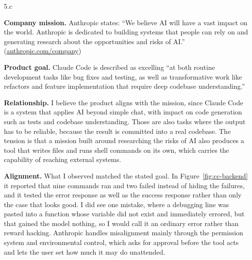 \LARGE
5.c
\normalsize

\begin{answer}
  \textbf{Company mission.} Anthropic states: ``We believe AI will have a vast impact on the world.
  Anthropic is dedicated to building systems that people can rely on and generating research about
  the opportunities and risks of AI.''
  (\href{https://www.anthropic.com/company}{anthropic.com/company})

  \medskip
  \textbf{Product goal.} Claude Code is described as excelling ``at both routine development tasks
  like bug fixes and testing, as well as transformative work like refactors and feature
  implementation that require deep codebase understanding.''

  \medskip
  \textbf{Relationship.} I believe the product aligns with the mission, since Claude Code is a
  system that applies AI beyond simple chat, with impact on code generation such as tests and
  codebase understanding. Those are also tasks where the output has to be reliable, because the
  result is committed into a real codebase. The tension is that a mission built around researching
  the risks of AI also produces a tool that writes files and runs shell commands on its own, which carries the capability of reaching external systems.

  \medskip
  \textbf{Alignment.} What I observed matched the stated goal. In Figure~\ref{fig:cc-backend} it
  reported that nine commands ran and two failed instead of hiding the failures, and it tested the
  error response as well as the success response rather than only the case that looks good. I did
  see one mistake, where a debugging line was pasted into a function whose variable did not exist
  and immediately errored, but that gained the model nothing, so I would call it an ordinary error
  rather than reward hacking. Anthropic handles misalignment mainly through the permission system and environmental control,
  which asks for approval before the tool acts and lets the user set how much it may do
  unattended.
\end{answer}

